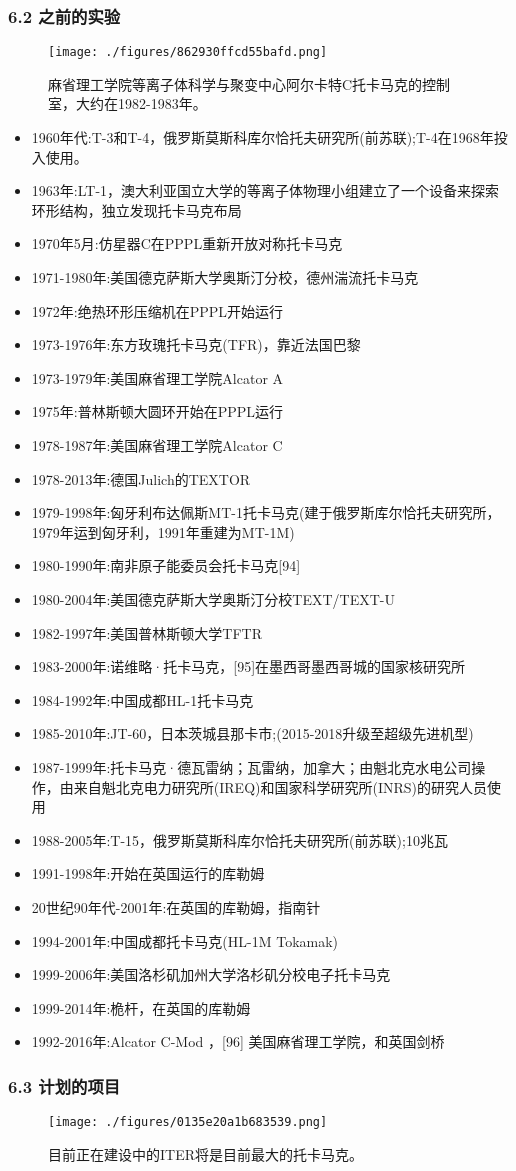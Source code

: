 \subsubsection{6.2 之前的实验}
\begin{figure}[ht]
\centering
\texttt{[image: ./figures/862930ffcd55bafd.png]}
\caption{麻省理工学院等离子体科学与聚变中心阿尔卡特C托卡马克的控制室，大约在1982-1983年。} \label{fig_TKMK_9}
\end{figure}
\begin{itemize}
\item 1960年代:T-3和T-4，俄罗斯莫斯科库尔恰托夫研究所(前苏联);T-4在1968年投入使用。
\item 1963年:LT-1，澳大利亚国立大学的等离子体物理小组建立了一个设备来探索环形结构，独立发现托卡马克布局
\item 1970年5月:仿星器C在PPPL重新开放对称托卡马克
\item 1971-1980年:美国德克萨斯大学奥斯汀分校，德州湍流托卡马克
\item 1972年:绝热环形压缩机在PPPL开始运行
\item 1973-1976年:东方玫瑰托卡马克(TFR)，靠近法国巴黎
\item 1973-1979年:美国麻省理工学院Alcator A
\item 1975年:普林斯顿大圆环开始在PPPL运行
\item 1978-1987年:美国麻省理工学院Alcator C
\item 1978-2013年:德国Julich的TEXTOR
\item 1979-1998年:匈牙利布达佩斯MT-1托卡马克(建于俄罗斯库尔恰托夫研究所，1979年运到匈牙利，1991年重建为MT-1M)
\item 1980-1990年:南非原子能委员会托卡马克[94]
\item 1980-2004年:美国德克萨斯大学奥斯汀分校TEXT/TEXT-U
\item 1982-1997年:美国普林斯顿大学TFTR
\item 1983-2000年:诺维略·托卡马克，[95]在墨西哥墨西哥城的国家核研究所
\item 1984-1992年:中国成都HL-1托卡马克
\item 1985-2010年:JT-60，日本茨城县那卡市;(2015-2018升级至超级先进机型)
\item 1987-1999年:托卡马克·德瓦雷纳；瓦雷纳，加拿大；由魁北克水电公司操作，由来自魁北克电力研究所(IREQ)和国家科学研究所(INRS)的研究人员使用
\item 1988-2005年:T-15，俄罗斯莫斯科库尔恰托夫研究所(前苏联);10兆瓦
\item 1991-1998年:开始在英国运行的库勒姆
\item 20世纪90年代-2001年:在英国的库勒姆，指南针
\item 1994-2001年:中国成都托卡马克(HL-1M Tokamak)
\item 1999-2006年:美国洛杉矶加州大学洛杉矶分校电子托卡马克
\item 1999-2014年:桅杆，在英国的库勒姆
\item 1992-2016年:Alcator C-Mod ，[96] 美国麻省理工学院，和英国剑桥
\end{itemize}
\subsubsection{6.3 计划的项目}
\begin{figure}[ht]
\centering
\texttt{[image: ./figures/0135e20a1b683539.png]}
\caption{目前正在建设中的ITER将是目前最大的托卡马克。} \label{fig_TKMK_10}
\end{figure}
\